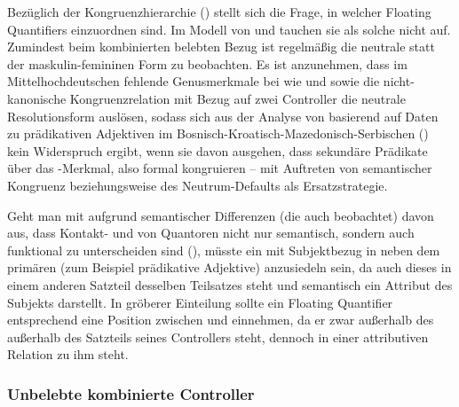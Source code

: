 Bezüglich der Kongruenzhierarchie
() stellt sich die Frage, in welcher 
Floating Quantifiers einzuordnen sind. Im Modell von
\citet{corbett1979} und \citet[84]{wechslerzlatic2003} tauchen sie als solche
nicht auf. Zumindest beim kombinierten belebten Bezug ist regelmäßig die
neutrale statt der maskulin-\allowbreak{}femi\-ninen Form zu beobachten. Es ist
anzunehmen, dass im Mittelhochdeutschen fehlende
Genusmerkmale bei  wie  und
 sowie die nicht-kanonische
Kongruenzrelation mit Bezug auf zwei
Controller die neutrale Resolutionsform auslösen, sodass sich aus der Analyse
von \citet[54--55, 84]{wechslerzlatic2003} basierend auf Daten zu prädikativen
Adjektiven im
Bos\-nisch-\allowbreak{}Kroa\-tisch-\allowbreak{}Maze\-donisch-\allowbreak{}Ser\-bischen
() kein Widerspruch ergibt, wenn sie davon ausgehen, dass sekundäre
Prädikate über das -Merkmal, also formal
kongruieren -- mit
Auftreten von semantischer Kongruenz beziehungsweise
des Neutrum-Defaults als Ersatzstrategie.

Geht man mit \citet{spector2009} aufgrund semantischer Differenzen (die auch
\cite{pittner1995} beobachtet) davon aus, dass Kontakt- und
 von Quantoren nicht nur semantisch, sondern auch
funktional zu unterscheiden sind (), müsste ein
 mit Subjektbezug in  neben
dem primären  (zum Beispiel prädikative
Adjektive) anzusiedeln sein, da auch dieses in einem
anderen Satzteil desselben Teilsatzes steht und semantisch ein
Attribut des Subjekts darstellt. In
 gröberer Einteilung sollte ein
Floating Quantifier entsprechend eine Position zwischen  und
 einnehmen, da er zwar außerhalb des außerhalb des
Satzteils seines Controllers steht, dennoch in einer attributiven Relation zu
ihm steht.


\subsubsection{Unbelebte kombinierte Controller}

